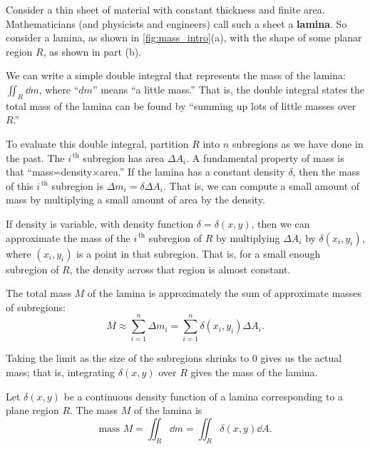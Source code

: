 Consider a thin sheet of material with constant thickness and finite area. Mathematicians (and physicists and engineers) call such a sheet a \textbf{lamina}. So consider a lamina, as shown in \autoref{fig:mass_intro}(a),  with the shape of some planar region $R$, as shown in part (b).

We can write a simple double integral that represents the mass of the lamina: $\iint_R\dd m$, where ``$dm$'' means ``a little mass.'' That is, the double integral states the total mass of the lamina can be found by ``summing up lots of little masses over $R$.''

To evaluate this double integral, partition $R$ into $n$ subregions as we have done in the past. The $i^{\,\text{th}}$ subregion has area $\Delta A_i$. 
A fundamental property of mass is that ``mass=density$\times$area.'' If the lamina has a constant density $\delta$, then the mass of this $i^{\,\text{th}}$ subregion is $\Delta m_i=\delta\Delta A_i$. %
That is, we can compute a small amount of mass by multiplying a small amount of area by the density.

If density is variable, with density function $\delta= \delta(x,y)$, then we can approximate the mass of the $i^{\,\text{th}}$ subregion of $R$ by multiplying $\Delta A_i$ by $\delta(x_i,y_i)$, where $(x_i,y_i)$ is a point in that subregion. That is, for a small enough subregion of $R$, the density across that region is almost constant. 


The total mass $M$ of the lamina is approximately the sum of approximate masses of subregions:
\[M \approx \sum_{i=1}^n \Delta m_i = \sum_{i=1}^n \delta(x_i,y_i)\Delta A_i.\]

Taking the limit as the size of the subregions shrinks to 0 gives us the actual mass; that is, integrating $\delta(x,y)$ over $R$ gives the mass of the lamina.

\begin{definition}\label{def:mass}
Let $\delta(x,y)$ be a continuous density function of a lamina corresponding to a plane region $R$. The mass $M$ of the lamina is
\[\text{mass } M = \iint_R\dd m = \iint_R \delta(x,y)\dd A.\]
\end{definition}

